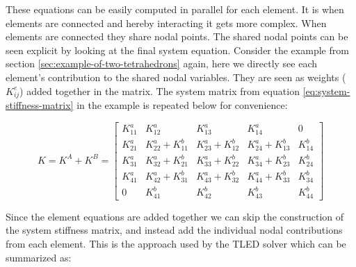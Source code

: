 These equations can be easily computed in parallel for each element.
It is when elements are connected and hereby interacting it gets
more complex. When elements are connected they share nodal points. The
shared nodal points can be seen explicit by looking at the final
system equation. Consider the example from section
\vref{sec:example-of-two-tetrahedrons} again, here we directly see each
element's contribution to the shared nodal variables. They are seen as
weights ($K_{ij}^e$) added together in the matrix. The system matrix
from equation \eqref{eq:system-stiffness-matrix} in the example is
repeated below for convenience:

\begin{equation*}
K = K^A + K^B =
\begin{bmatrix}
K^a_{11} & K^a_{12} & K^a_{13} & K^a_{14} & 0\\

K^a_{21} & K^a_{22} + K^b_{11} & K^a_{23} + K^b_{12} & K^a_{24} +
K^b_{13} & K^b_{14}\\

K^a_{31} & K^a_{32} + K^b_{21} & K^a_{33} + K^b_{22} & K^a_{34} +
K^b_{23} & K^b_{24}\\

K^a_{41} & K^a_{42} + K^b_{31} & K^a_{43} + K^b_{32} & K^a_{44} +
K^b_{33} & K^b_{34}\\

0 & K^b_{41} & K^b_{42} & K^b_{43} & K^b_{44}
\end{bmatrix}
\end{equation*}

Since the element equations are added together we can skip the
construction of the system stiffness matrix, and instead add the
individual nodal contributions from each element. This is
the approach used by the TLED solver which can be summarized as:
%
%
%

